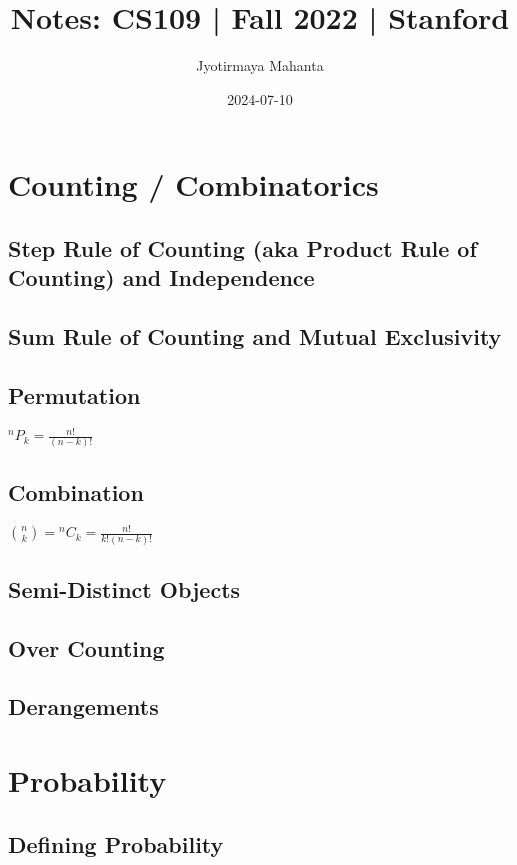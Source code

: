 \documentclass{article}
\title{Notes: CS109 | Fall 2022 | Stanford}
\date{2024-07-10}
\author{Jyotirmaya Mahanta}
\newcommand*{\Perm}[2]{{}^{#1}\!P_{#2}}
\newcommand*{\Comb}[2]{{}^{#1}C_{#2}}
\begin{document}
    \maketitle
    \newpage

    \section{Counting / Combinatorics}
    \subsection{Step Rule of Counting (aka Product Rule of Counting) and Independence}
    \subsection{Sum Rule of Counting and Mutual Exclusivity}
    \subsection{Permutation}
        \begin{center}
            $\Perm{n}{k}=\frac{n!}{(n-k)!}$
        \end{center}
    \subsection{Combination}
        \begin{center}
            $\binom nk=\Comb{n}{k}=\frac{n!}{k!(n-k)!}$
        \end{center}
    \subsection{Semi-Distinct Objects}
    \subsection{Over Counting}
    \subsection{Derangements}
    \section{Probability}
    \subsection{Defining Probability}
\end{document}
